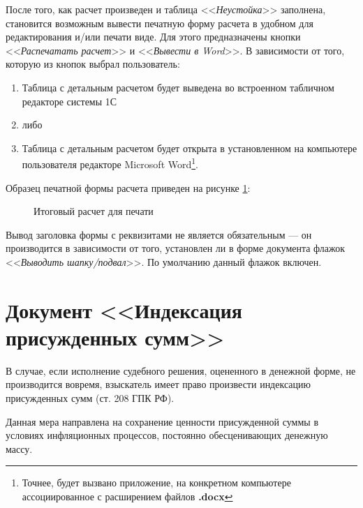 \documentclass[a4paper,12pt,draft]{article}
\begin{document}
После того, как расчет произведен и таблица <<{\it Неустойка}>> заполнена, становится возможным вывести печатную форму расчета в удобном для редактирования и/или печати виде. Для этого предназначены кнопки <<{\it Распечатать расчет}>> и <<{\it Вывести в Word}>>. В зависимости от того, которую из кнопок выбрал пользователь:
\begin{enumerate}
\item Таблица с детальным расчетом будет выведена во встроенном табличном редакторе системы 1С
\item[] либо
\item Таблица с детальным расчетом будет открыта в установленном на компьютере пользователя редакторе Microsoft Word\footnote{Точнее, будет вызвано приложение, на конкретном компьютере ассоциированное с расширением файлов {\bf *.docx}}.
\end{enumerate}

Образец печатной формы расчета приведен на рисунке \ref{ris:pf}:
\begin{figure}[th]
\caption{Итоговый расчет для печати}
\label{ris:pf}
\end{figure}

Вывод заголовка формы с реквизитами не является обязательным --- он производится в зависимости от того, установлен ли в форме документа флажок <<{\it Выводить шапку/подвал}>>. По умолчанию данный флажок включен.
\clearpage
\section{Документ <<Индексация присужденных сумм>>}

В случае, если исполнение судебного решения, оцененного в денежной форме, не производится вовремя, взыскатель имеет право произвести индексацию присужденных сумм (ст. 208 ГПК РФ).

Данная мера направлена на сохранение ценности присужденной суммы в условиях инфляционных процессов, постоянно обесценивающих денежную массу.
\end{document}
